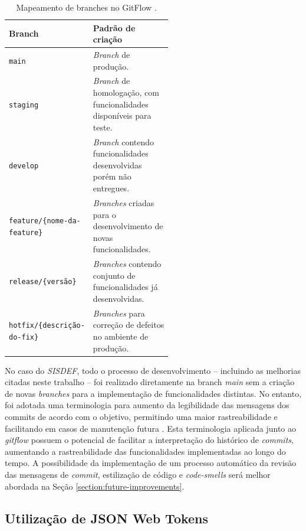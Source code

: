 \documentclass[nonacm, sigconf]{acmart}
\begin{document}
\begin{table}
  \caption{Mapeamento de branches no GitFlow \cite{uppala2024software}.}
  \label{tab:git-strategy-branches}
  \centering
  \small
  \begin{tabular}{l p{0.55\linewidth}}
    \toprule
    Branch & Padrão de criação \\
    \midrule
    \texttt{main} & \textit{Branch} de produção. \\
    \texttt{staging} & \textit{Branch} de homologação, com funcionalidades disponíveis para teste. \\
    \texttt{develop} & \textit{Branch} contendo funcionalidades desenvolvidas porém não entregues. \\
    \texttt{feature/\{nome-da-feature\}} & \textit{Branches} criadas para o desenvolvimento de novas funcionalidades. \\
    \texttt{release/\{versão\}} & \textit{Branches} contendo conjunto de funcionalidades já desenvolvidas. \\
    \texttt{hotfix/\{descrição-do-fix\}} & \textit{Branches} para correção de defeitos no ambiente de produção. \\
    \bottomrule
  \end{tabular}
\end{table}

No caso do \textit{SISDEF}, todo o processo de desenvolvimento -- incluindo as melhorias citadas neste trabalho -- foi realizado diretamente na branch \textit{main} sem a criação de novas \textit{branches} para a implementação de funcionalidades distintas. No entanto, foi adotada uma terminologia para aumento da legibilidade das mensagens dos commits de acordo com o objetivo, permitindo uma maior rastreabilidade e facilitando em casos de manutenção futura \cite{conventional-commits}. Esta terminologia aplicada junto ao \textit{gitflow} possuem o potencial de facilitar a interpretação do histórico de \textit{commits}, aumentando a rastreabilidade das funcionalidades implementadas ao longo do tempo. A possibilidade da implementação de um processo automático da revisão das mensagens de \textit{commit}, estilização de código e \textit{code-smells} será melhor abordada na Seção \ref{section:future-improvements}.

\subsection{Utilização de JSON Web Tokens}
\label{section:jwt-development}
\end{document}
